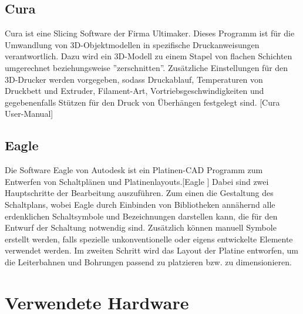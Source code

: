 \documentclass[11pt, titlepage]{report}
\begin{document}
			\subsection*{Cura}
			\label{sec:Cura}
				Cura ist eine Slicing Software der Firma Ultimaker. Dieses Programm ist für die Umwandlung von 3D-Objektmodellen in spezifische Druckanweisungen verantwortlich. Dazu wird ein 3D-Modell zu einem Stapel von flachen Schichten umgerechnet beziehungsweise ''zerschnitten''. Zusätzliche Einstellungen für den 3D-Drucker werden vorgegeben, sodass Druckablauf, Temperaturen von Druckbett und Extruder, Filament-Art, 
				Vortriebsgeschwindigkeiten und gegebenenfalls Stützen für den Druck von Überhängen festgelegt sind. [Cura User-Manual\cite[S.26-29]{Cura}]
			\subsection*{Eagle}
			\label{sec:Eagle}
				Die Software Eagle von Autodesk ist ein Platinen-CAD Programm zum Entwerfen von Schaltplänen und Platinenlayouts.[Eagle \cite{Eagle}] Dabei sind zwei Hauptschritte der Bearbeitung auszuführen. Zum einen die Gestaltung des Schaltplans, wobei Eagle durch Einbinden von Bibliotheken annähernd alle erdenklichen Schaltsymbole und Bezeichnungen darstellen kann, die für den Entwurf der Schaltung notwendig sind. Zusätzlich können manuell Symbole erstellt werden, falls spezielle unkonventionelle oder eigens entwickelte Elemente verwendet werden.
				Im zweiten Schritt wird das Layout der Platine entworfen, um die Leiterbahnen und Bohrungen passend zu platzieren bzw. zu dimensionieren.
		\section{Verwendete Hardware}
\end{document}

